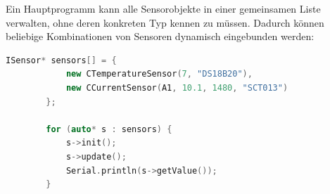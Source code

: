	{
	}

	Ein Hauptprogramm kann alle Sensorobjekte in einer gemeinsamen Liste verwalten, 
	ohne deren konkreten Typ kennen zu müssen. Dadurch können beliebige Kombinationen von Sensoren dynamisch eingebunden werden:
	
	\begin{lstlisting}[language=C++,caption={Beispielhafter Polymorphismus für mehrere Sensortypen}]
		ISensor* sensors[] = {
			new CTemperatureSensor(7, "DS18B20"),
			new CCurrentSensor(A1, 10.1, 1480, "SCT013")
		};
		
		for (auto* s : sensors) {
			s->init();
			s->update();
			Serial.println(s->getValue());
		}
	\end{lstlisting}
	